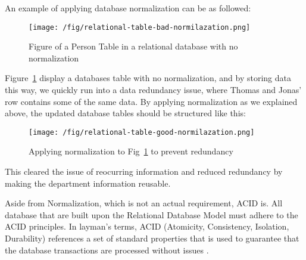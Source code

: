 An example of applying database normalization can be as followed:
\begin{figure}[h]
    \centering
    \texttt{[image: /fig/relational-table-bad-normilazation.png]}
    \caption{Figure of a Person Table in a relational database with no normalization}
    \label{fig:relational-database-table-normalization-bad}
\end{figure}

Figure~\ref{fig:relational-database-table-normalization-bad} display a databases table with no normalization, and by storing data this way, we quickly run into a data redundancy issue, where Thomas and Jonas' row contains some of the same data.
By applying normalization as we explained above, the updated database tables should be structured like this:
\begin{figure}[h]
    \centering
    \texttt{[image: /fig/relational-table-good-normilazation.png]}
    \caption{Applying normalization to Fig~\ref{fig:relational-database-table-normalization-bad} to prevent redundancy}
    \label{fig:relational-database-table-normalization-good}
\end{figure}

This cleared the issue of reocurring information and reduced redundancy by making the department information reusable.

Aside from Normalization, which is not an actual requirement, ACID is.
All database that are built upon the Relational Database Model must adhere to the ACID principles. In layman's terms, ACID (Atomicity, Consistency, Isolation, Durability) references a set of standard properties that is used to guarantee that the database transactions are processed without issues \parencite{bmc-acid}.\\

